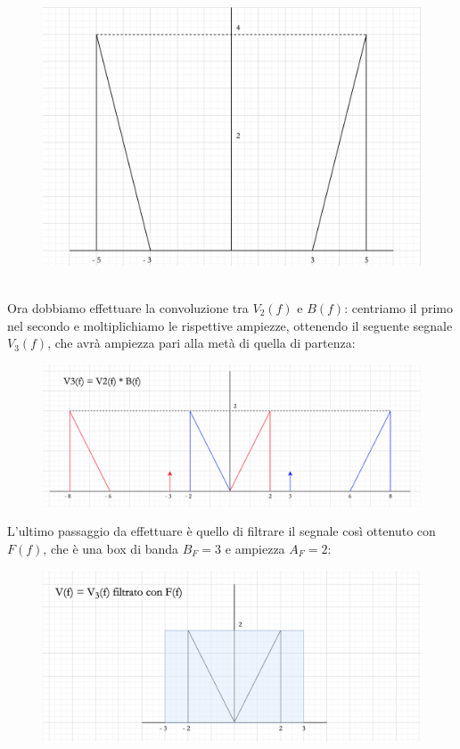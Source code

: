 \documentclass[12pt,a4paper]{article}
\begin{document}
	\begin{figure}[h!]
		\centering
		\includegraphics[scale=0.3]{./images/fourier35.png}
	\end{figure}
	\\ Ora dobbiamo effettuare la convoluzione tra $V_2(f)$ e $B(f)$: centriamo il primo nel secondo e moltiplichiamo le rispettive ampiezze, ottenendo il seguente segnale $V_3(f)$, che avrà ampiezza pari alla metà di quella di partenza:
	\begin{figure}[h!]
		\centering
		\includegraphics[scale=0.4]{./images/fourier36.png}
	\end{figure}
	\newpage
	L'ultimo passaggio da effettuare è quello di filtrare il segnale così ottenuto con $F(f)$, che è una box di banda $B_F = 3$ e ampiezza $A_F = 2$:
	\begin{figure}[h!]
		\centering
		\includegraphics[scale=0.4]{./images/fourier38.png}
	\end{figure}
\end{document}
